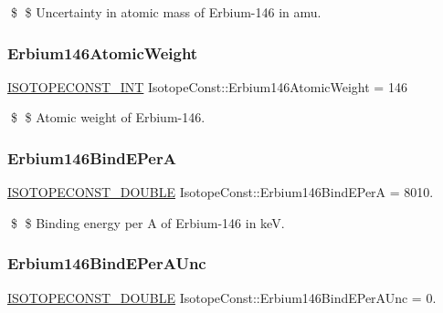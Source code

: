 \$ \$ Uncertainty in atomic mass of Erbium-\/146 in amu. \mbox{\label{group___isotope_const-_erbium-_er146_ga049432048cdbf464fdec5976b3459618}} 
\subsubsection{\texorpdfstring{Erbium146\+Atomic\+Weight}{Erbium146AtomicWeight}}
{\footnotesize\ttfamily \mbox{\hyperlink{group___isotope_const-_macros_ga5f18360b3e99483a35c32d789e62621c}{I\+S\+O\+T\+O\+P\+E\+C\+O\+N\+S\+T\+\_\+\+I\+NT}} Isotope\+Const\+::\+Erbium146\+Atomic\+Weight = 146}

\$ \$ Atomic weight of Erbium-\/146. \mbox{\label{group___isotope_const-_erbium-_er146_ga443eba42f2ab5768eea1a8419b1b809f}} 
\subsubsection{\texorpdfstring{Erbium146\+Bind\+E\+PerA}{Erbium146BindEPerA}}
{\footnotesize\ttfamily \mbox{\hyperlink{group___isotope_const-_macros_ga8f45a7272ce02c0b4c65c44636ed719a}{I\+S\+O\+T\+O\+P\+E\+C\+O\+N\+S\+T\+\_\+\+D\+O\+U\+B\+LE}} Isotope\+Const\+::\+Erbium146\+Bind\+E\+PerA = 8010.}

\$ \$ Binding energy per A of Erbium-\/146 in keV. \mbox{\label{group___isotope_const-_erbium-_er146_ga1598594444ee5a6ec1d83c6d287c0ebb}} 
\subsubsection{\texorpdfstring{Erbium146\+Bind\+E\+Per\+A\+Unc}{Erbium146BindEPerAUnc}}
{\footnotesize\ttfamily \mbox{\hyperlink{group___isotope_const-_macros_ga8f45a7272ce02c0b4c65c44636ed719a}{I\+S\+O\+T\+O\+P\+E\+C\+O\+N\+S\+T\+\_\+\+D\+O\+U\+B\+LE}} Isotope\+Const\+::\+Erbium146\+Bind\+E\+Per\+A\+Unc = 0.}

